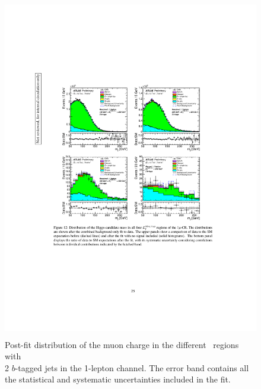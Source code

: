 \begin{figure}[!htb]
    \includegraphics[width=15cm,height=15cm, trim={4cm 9cm 4cm 6cm}, clip]{chapters/c9/figures/post-fit-1lep.pdf}

  \caption{Post-fit distribution of the muon charge in the different \met~regions with \\2 $b$-tagged jets in the 1-lepton channel. The error band contains all the statistical and systematic uncertainties included in the fit.}
  \label{fig:Data_MC_CR1_mu_charge_2b_postfit}
\end{figure}


